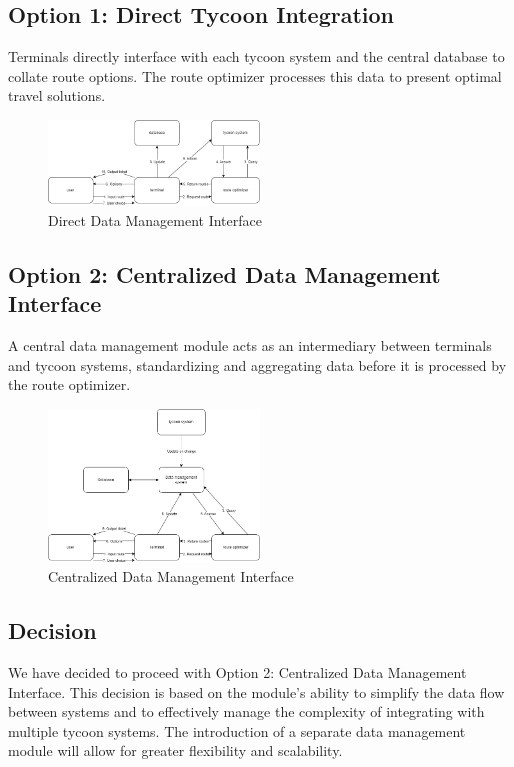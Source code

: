 \subsection*{Option 1: Direct Tycoon Integration}
Terminals directly interface with each tycoon system and the central database to collate route options. The route optimizer processes this data to present optimal travel solutions.
\begin{figure}[ht]
    \centering
    \includegraphics[width=0.5\textwidth]{drawings/decision3_drawings/direct.png}
    \caption{Direct Data Management Interface}
    \label{fig:direct-data-interface}
\end{figure}

\subsection*{Option 2: Centralized Data Management Interface}
A central data management module acts as an intermediary between terminals and tycoon systems, standardizing and aggregating data before it is processed by the route optimizer.
\begin{figure}[ht]
    \centering
    \includegraphics[width=0.5\textwidth]{drawings/decision3_drawings/centralized.png}
    \caption{Centralized Data Management Interface}
    \label{fig:centralized-data-interface}
\end{figure}
  
\subsection*{Decision}
We have decided to proceed with Option 2: Centralized Data Management Interface. This decision is based on the module's ability to simplify the data flow between systems and to effectively manage the complexity of integrating with multiple tycoon systems. The introduction of a separate data management module will allow for greater flexibility and scalability.

